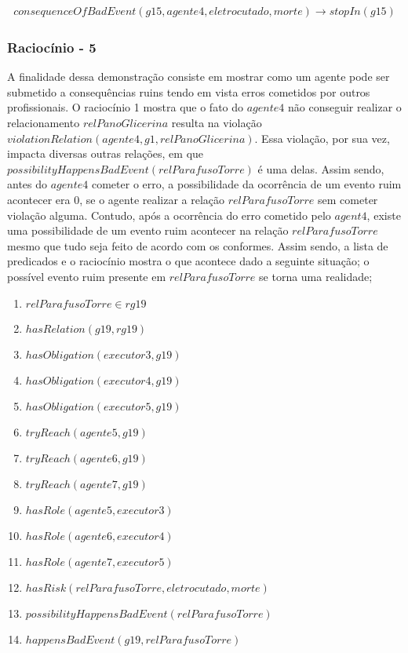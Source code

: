 \begin{eqnarray}
	consequenceOfBadEvent(g15,agente4,eletrocutado,morte) \to stopIn(g15)
\end{eqnarray}

\subsubsection{Raciocínio - 5} 

A finalidade dessa demonstração consiste em mostrar como um agente pode ser submetido a consequências ruins tendo em vista erros cometidos por outros profissionais. O raciocínio 1 mostra que o fato do $agente4$ não conseguir realizar o relacionamento $relPanoGlicerina$ resulta na violação $violationRelation(agente4,g1,relPanoGlicerina)$. Essa violação, por sua vez, impacta diversas outras relações, em que $possibilityHappensBadEvent(relParafusoTorre)$ é uma delas. Assim sendo, antes do $agente4$ cometer o erro, a possibilidade da ocorrência de um evento ruim acontecer era 0, se o agente realizar a relação $relParafusoTorre$ sem cometer violação alguma. Contudo, após a ocorrência do erro cometido pelo $agent4$, existe uma possibilidade de um evento ruim acontecer na relação $relParafusoTorre$ mesmo que tudo seja feito de acordo com os conformes. Assim sendo, a lista de predicados e o raciocínio mostra o que acontece dado a seguinte situação; o possível evento ruim presente em $relParafusoTorre$ se torna uma realidade;  

\begin{enumerate}
	\item $relParafusoTorre \in rg19$	
	\item $hasRelation(g19,rg19)$		
	\item $hasObligation(executor3,g19)$
	\item $hasObligation(executor4,g19)$
	\item $hasObligation(executor5,g19)$		
	\item $tryReach(agente5,g19)$
	\item $tryReach(agente6,g19)$
	\item $tryReach(agente7,g19)$									
	\item $hasRole(agente5,executor3)$
	\item $hasRole(agente6,executor4)$
	\item $hasRole(agente7,executor5)$
	\item $hasRisk(relParafusoTorre,eletrocutado,morte)$
	\item $possibilityHappensBadEvent(relParafusoTorre)$
	\item $happensBadEvent(g19,relParafusoTorre)$	
\end{enumerate}



